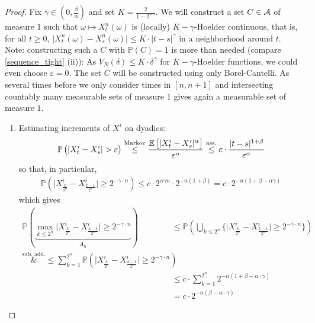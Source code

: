 \begin{proof}
	Fix $\gamma\in \left(0,\frac{\beta}{\alpha}\right)$ and set $K = \frac{2}{1-2^{-\gamma}}$. We will construct a set $C\in \mathcal{A}$ of measure $1$ such that $\omega \mapsto X_t^n(\omega)$ is (locally) $K-\gamma$-Hoelder continuous, that is, for all $t\geq 0$, $\lvert X_t^n(\omega) - X_s^n(\omega) \rvert \leq K \cdot \lvert t- s \rvert^{\gamma}$ in a neighborhood around $t$. Note: constructing such a $C$ with $\mathbb{P}(C) = 1$ is more than needed (compare \ref{sequence_tight} (ii)): As $V_N(\delta) \leq K \cdot \delta^{\gamma}$ for $K-\gamma$-Hoelder functions, we could even choose $\varepsilon = 0$. The set $C$ will be constructed using only Borel-Cantelli. As several times before we only consider times in $[n,n+1]$ and intersecting countably many measurable sets of measure $1$ gives again a measurable set of measure $1$.
	\begin{enumerate}
		\item
			Estimating increments of $X^i$ on \underline{} dyadics: 
			\begin{align*}
				\mathbb{P}\left(\lvert X_t^i - X_s^i \rvert > \varepsilon \right) \overset{\text{Markov}}{\leq}  \frac{\mathbb{E}\left[ \lvert X_t^i - X_s^i \rvert^{\alpha} \right]}{\varepsilon^{\alpha}} \overset{\text{ass.}}{\leq} c \cdot \frac{\lvert t -s \rvert^{1+\beta}}{\varepsilon^{\alpha}}
			\end{align*}
			so that, in particular,
			\begin{align*}
				\mathbb{P}\left(\lvert X_{\frac{k}{2^n}}^i - X_{\frac{k-1}{2^n}}^i \rvert \geq 2^{-\gamma \cdot n}\right) \leq c \cdot 2^{\alpha \gamma n} \cdot 2^{-n(1+\beta)} = c \cdot 2^{-n (1+\beta - \alpha \gamma)}
			\end{align*}
			which gives 
			\begin{align*}
				\mathbb{P} \left( \underbrace{\max_{k\leq 2^n} \lvert X_{\frac{k}{2^n}}^i - X_{\frac{k-1}{2^n}}^i \rvert \geq 2^{-\gamma \cdot n}}_{A_n} \right) &\leq \mathbb{P} \left( \bigcup_{k\leq 2^n} \bigg\{ \big\lvert X_{\frac{k}{2^n}}^i - X_{\frac{k-1}{2^n}}^i\big\rvert \geq 2^{-\gamma \cdot n}\bigg\}\right) \\
				\overset{\text{sub. add.}}&{\leq} \sum_{k=1}^{2^n} \mathbb{P}\left( \lvert X_{\frac{k}{2^n}}^i - X_{\frac{k-1}{2^n}}^i\big\rvert \geq 2^{-\gamma \cdot n}\right) \\
				&\leq c \cdot \sum_{k=1}^{2^n} 2^{-n (1+\beta - \alpha \cdot\gamma)} \\
				&= c \cdot 2^{-n(\beta - \alpha \cdot \gamma)}

\end{align*}
\end{enumerate}
\end{proof}
